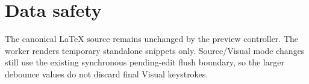 \documentclass[a4paper]{article}
\begin{document}
   \section{Data safety}
      The canonical LaTeX source remains unchanged by the preview controller. The
      worker renders temporary standalone snippets only. Source/Visual mode changes
      still use the existing synchronous pending-edit flush boundary, so the larger
      debounce values do not discard final Visual keystrokes.

   
   
\end{document}
